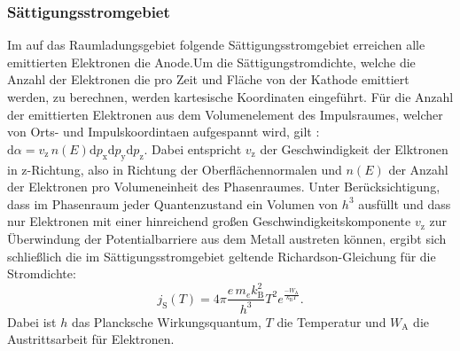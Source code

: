 \subsubsection{Sättigungsstromgebiet}
Im auf das Raumladungsgebiet folgende Sättigungsstromgebiet erreichen alle emittierten Elektronen die Anode.Um die Sättigungstromdichte, welche die Anzahl der Elektronen die pro Zeit und Fläche von der Kathode emittiert werden, zu berechnen, werden kartesische Koordinaten eingeführt. Für die Anzahl der emittierten Elektronen aus dem Volumenelement des Impulsraumes, welcher von Orts- und Impulskoordintaen aufgespannt wird, gilt : $\mathrm d\alpha = v_\mathrm{z}\,n(E)\mathrm{d }p_\mathrm{x}\mathrm{d} p_\mathrm{y} \mathrm{d} p_\mathrm{z}$. Dabei entspricht $v_\mathrm{z}$ der Geschwindigkeit der Elktronen in z-Richtung, also in Richtung der Oberflächennormalen und $n(E)$ der Anzahl der Elektronen pro Volumeneinheit des Phasenraumes. Unter Berücksichtigung, dass im Phasenraum jeder Quantenzustand ein Volumen von $h^3$ ausfüllt und dass nur Elektronen mit einer hinreichend großen Geschwindigkeitskomponente  $v_\mathrm{z}$  zur Überwindung der Potentialbarriere aus dem Metall austreten können, ergibt sich schließlich die im Sättigungsstromgebiet geltende Richardson-Gleichung für die Stromdichte:
\begin{equation}
  \label{eqn:richardson}
  j_\mathrm{S}(T)=4\pi\frac{e\, m_e k_\mathrm{B}^2}{h^3}T^2e^{\frac{-W_\mathrm{A}}{k_\mathrm{B}T}}.
\end{equation}
Dabei ist $h$ das Plancksche Wirkungsquantum, $T$ die Temperatur und $W_\mathrm{A}$ die Austrittsarbeit für Elektronen.
